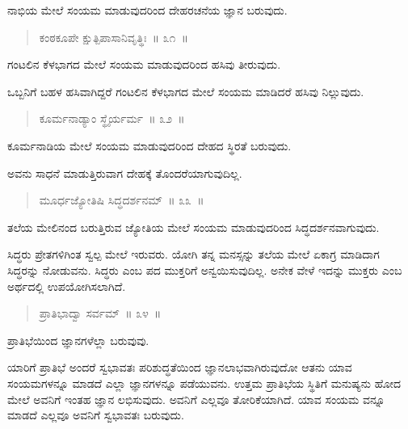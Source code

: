 ನಾಭಿಯ ಮೇಲೆ ಸಂಯಮ ಮಾಡುವುದರಿಂದ ದೇಹರಚನೆಯ ಜ್ಞಾನ ಬರುವುದು. 

\vspace{-0.3cm}

\begin{verse}
ಕಂಠಕೂಪೇ ಕ್ಷುತ್ಪಿಪಾಸಾನಿವೃತ್ಥಿಃ~॥ ೩೧~॥
\end{verse}

\vspace{-0.3cm}

ಗಂಟಲಿನ ಕೆಳಭಾಗದ ಮೇಲೆ ಸಂಯಮ ಮಾಡುವುದರಿಂದ ಹಸಿವು ತೀರುವುದು. 

ಒಬ್ಬನಿಗೆ ಬಹಳ ಹಸಿವಾಗಿದ್ದರೆ ಗಂಟಲಿನ ಕೆಳಭಾಗದ ಮೇಲೆ ಸಂಯಮ ಮಾಡಿದರೆ ಹಸಿವು ನಿಲ್ಲುವುದು. 

\vspace{-0.3cm}

\begin{verse}
ಕೂರ್ಮನಾಡ್ಯಾಂ ಸ್ಥೈರ್ಯರ್ಮ~॥ ೩೨~॥
\end{verse}

\vspace{-0.3cm}

ಕೂರ್ಮನಾಡಿಯ ಮೇಲೆ ಸಂಯಮ ಮಾಡುವುದರಿಂದ ದೇಹದ ಸ್ಥಿರತೆ ಬರುವುದು. 

ಅವನು ಸಾಧನೆ ಮಾಡುತ್ತಿರುವಾಗ ದೇಹಕ್ಕೆ ತೊಂದರೆಯಾಗುವುದಿಲ್ಲ. 

\vspace{-0.3cm}

\begin{verse}
ಮೂರ್ಧಜ್ಯೋತಿಷಿ ಸಿದ್ಧದರ್ಶನಮ್​~॥ ೩೩~॥
\end{verse}

\vspace{-0.3cm}

ತಲೆಯ ಮೇಲಿನಂದ ಬರುತ್ತಿರುವ ಜ್ಯೋತಿಯ ಮೇಲೆ ಸಂಯಮ ಮಾಡುವುದರಿಂದ ಸಿದ್ಧದರ್ಶನವಾಗುವುದು. 

ಸಿದ್ಧರು ಪ್ರೇತಗಳಿಗಿಂತ ಸ್ವಲ್ಪ ಮೇಲೆ ಇರುವರು. ಯೋಗಿ ತನ್ನ ಮನಸ್ಸನ್ನು ತಲೆಯ ಮೇಲೆ ಏಕಾಗ್ರ ಮಾಡಿದಾಗ ಸಿದ್ಧರನ್ನು ನೋಡುವನು. ಸಿದ್ಧರು ಎಂಬ ಪದ ಮುಕ್ತರಿಗೆ ಅನ್ವಯಿಸುವುದಿಲ್ಲ. ಅನೇಕ ವೇಳೆ ಇದನ್ನು ಮುಕ್ತರು ಎಂಬ ಅರ್ಥದಲ್ಲಿ ಉಪಯೋಗಿಸಲಾಗಿದೆ. 

\vspace{-0.3cm}

\begin{verse}
ಪ್ರಾತಿಭಾದ್ವಾ ಸರ್ವಮ್​~॥ ೩೪~॥
\end{verse}

\vspace{-0.3cm}

ಪ್ರಾತಿಭೆಯಿಂದ ಜ್ಞಾನಗಳೆಲ್ಲಾ ಬರುವುವು. 

ಯಾರಿಗೆ ಪ್ರಾತಿಭೆ ಅಂದರೆ ಸ್ವಭಾವತಃ ಪರಿಶುದ್ಧತೆಯಿಂದ ಜ್ಞಾನಲಾಭವಾಗಿರುವುದೋ ಆತನು ಯಾವ ಸಂಯಮಗಳನ್ನೂ ಮಾಡದೆ ಎಲ್ಲಾ ಜ್ಞಾನಗಳನ್ನೂ ಪಡೆಯುವನು. ಉತ್ತಮ ಪ್ರಾತಿಭೆಯ ಸ್ಥಿತಿಗೆ ಮನುಷ್ಯನು ಹೋದ ಮೇಲೆ ಅವನಿಗೆ ಇಂತಹ ಜ್ಞಾನ ಲಭಿಸುವುದು. ಅವನಿಗೆ ಎಲ್ಲವೂ ತೋರಿಕೆಯಾಗಿದೆ. ಯಾವ ಸಂಯಮ ವನ್ನೂ ಮಾಡದೆ ಎಲ್ಲವೂ ಅವನಿಗೆ ಸ್ವಭಾವತಃ ಬರುವುದು. 

